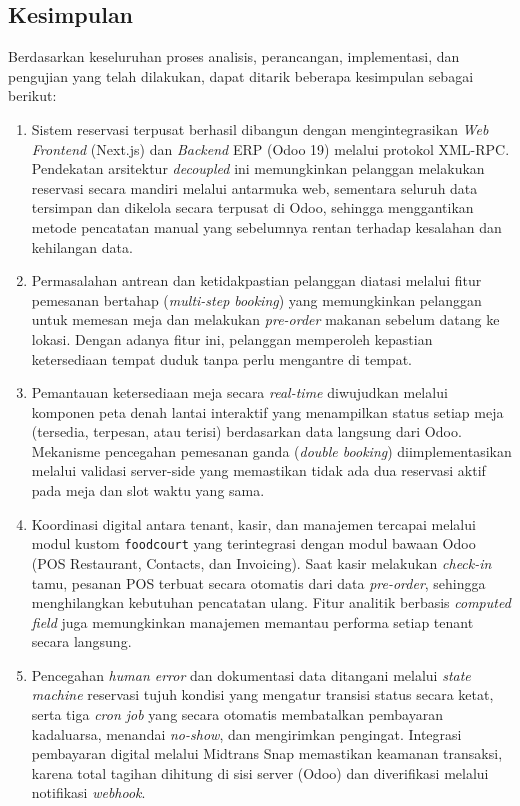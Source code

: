 \documentclass[conference]{IEEEtran}
\begin{document}
\subsection{Kesimpulan}
Berdasarkan keseluruhan proses analisis, perancangan, implementasi, dan pengujian yang telah dilakukan, dapat ditarik beberapa kesimpulan sebagai berikut:

\begin{enumerate}
    \item Sistem reservasi terpusat berhasil dibangun dengan mengintegrasikan \textit{Web Frontend} (Next.js) dan \textit{Backend} ERP (Odoo 19) melalui protokol XML-RPC. Pendekatan arsitektur \textit{decoupled} ini memungkinkan pelanggan melakukan reservasi secara mandiri melalui antarmuka web, sementara seluruh data tersimpan dan dikelola secara terpusat di Odoo, sehingga menggantikan metode pencatatan manual yang sebelumnya rentan terhadap kesalahan dan kehilangan data.
    
    \item Permasalahan antrean dan ketidakpastian pelanggan diatasi melalui fitur pemesanan bertahap (\textit{multi-step booking}) yang memungkinkan pelanggan untuk memesan meja dan melakukan \textit{pre-order} makanan sebelum datang ke lokasi. Dengan adanya fitur ini, pelanggan memperoleh kepastian ketersediaan tempat duduk tanpa perlu mengantre di tempat.
    
    \item Pemantauan ketersediaan meja secara \textit{real-time} diwujudkan melalui komponen peta denah lantai interaktif yang menampilkan status setiap meja (tersedia, terpesan, atau terisi) berdasarkan data langsung dari Odoo. Mekanisme pencegahan pemesanan ganda (\textit{double booking}) diimplementasikan melalui validasi server-side yang memastikan tidak ada dua reservasi aktif pada meja dan slot waktu yang sama.
    
    \item Koordinasi digital antara tenant, kasir, dan manajemen tercapai melalui modul kustom \texttt{foodcourt} yang terintegrasi dengan modul bawaan Odoo (POS Restaurant, Contacts, dan Invoicing). Saat kasir melakukan \textit{check-in} tamu, pesanan POS terbuat secara otomatis dari data \textit{pre-order}, sehingga menghilangkan kebutuhan pencatatan ulang. Fitur analitik berbasis \textit{computed field} juga memungkinkan manajemen memantau performa setiap tenant secara langsung.
    
    \item Pencegahan \textit{human error} dan dokumentasi data ditangani melalui \textit{state machine} reservasi tujuh kondisi yang mengatur transisi status secara ketat, serta tiga \textit{cron job} yang secara otomatis membatalkan pembayaran kadaluarsa, menandai \textit{no-show}, dan mengirimkan pengingat. Integrasi pembayaran digital melalui Midtrans Snap memastikan keamanan transaksi, karena total tagihan dihitung di sisi server (Odoo) dan diverifikasi melalui notifikasi \textit{webhook}.
\end{enumerate}
\end{document}
